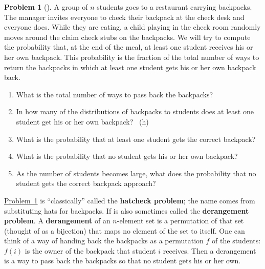 \documentclass[10pt,]{book}
\newcommand{\terminology}[1]{\textbf{#1}}
\theoremstyle{plain}
\theoremstyle{definition}
\newtheorem{activity}[project]{Problem}
\theoremstyle{definition}
\numberwithin{equation}{chapter}
\newcommand{\importantarrow}{\Rightarrow}
\begin{document}
\begin{activity}[] \label{hatcheck}
\hypertarget{p-1335}{}%
A group of \(n\) students goes to a restaurant carrying backpacks. The manager invites everyone to check their backpack at the check desk and everyone does. While they are eating, a child playing in the check room randomly moves around the claim check stubs on the backpacks. We will try to compute the probability that, at the end of the meal, at least one student receives his or her own backpack.  This probability is the fraction of the total number of ways to return the backpacks in which at least one student gets his or her own backpack back.%
\begin{enumerate}[font=\bfseries,label=(\alph*),ref=\alph*]
\item\label{task-168} \marginsymbol[-2.5em]{} \hypertarget{p-1336}{}%
What is the total number of ways to pass back the backpacks?%
\item\label{task-169} \marginsymbol[-2.5em]{} \hypertarget{p-1338}{}%
In how many of the distributions of backpacks to students does at least one student get his or her own backpack?%
~{\tiny (h)}\item\label{task-170} \marginsymbol[-2.5em]{} \hypertarget{p-1342}{}%
What is the probability that at least one student gets the correct backpack?%
\item\label{hatcheckprobpart} \marginsymbol[-2.5em]{} \hypertarget{p-1344}{}%
What is the probability that no student gets his or her own backpack?%
\item\label{task-172} \marginsymbol[-2.5em]{\pdftooltip{$\importantarrow$}{especially interesting}} \hypertarget{p-1346}{}%
As the number of students becomes large, what does the probability that no student gets the correct backpack approach?%
\end{enumerate}
\end{activity}
\hypertarget{p-1348}{}%
\hyperref[hatcheck]{Problem~\ref{hatcheck}} is ``classically'' called the \terminology{hatcheck problem}; the name comes from substituting hats for backpacks. If is also sometimes called the \terminology{derangement problem}. A \terminology{derangement} of an \(n\)-element set is a permutation of that set (thought of as a bijection) that maps no element of the set to itself. One can think of a way of handing back the backpacks as a permutation \(f\) of the students: \(f(i)\) is the owner of the backpack that student \(i\) receives. Then a derangement is a way to pass back the backpacks so that no student gets his or her own.%
\typeout{************************************************}
\typeout{************************************************}
\end{document}
